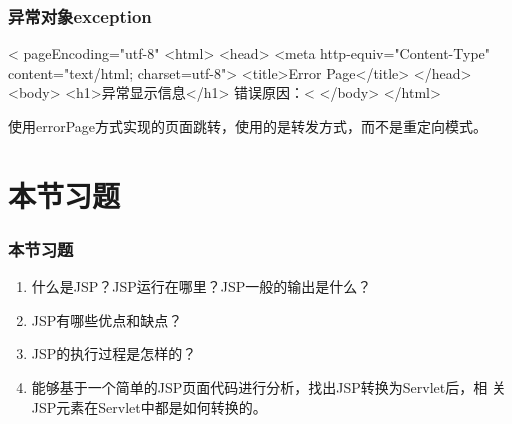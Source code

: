 \begin{frame}[fragile] %
\frametitle{异常对象exception} 


\begin{jspCode}
  <%
    pageEncoding="utf-8"%
  <html>
    <head>
      <meta http-equiv="Content-Type" content="text/html; charset=utf-8">
      <title>Error Page</title>
    </head>
    <body>
      <h1>异常显示信息</h1>
      错误原因：<%
    </body>
  </html>  
\end{jspCode}

{\kai\Red 使用errorPage方式实现的页面跳转，使用的是转发方式，而不是重定向模式。}
\end{frame}



\section{本节习题}

\begin{frame}
  \frametitle{本节习题}

  
  \begin{enumerate}
  \item 什么是JSP？JSP运行在哪里？JSP一般的输出是什么？
  \item JSP有哪些优点和缺点？
  \item JSP的执行过程是怎样的？
  \item 能够基于一个简单的JSP页面代码进行分析，找出JSP转换为Servlet后，相
    关JSP元素在Servlet中都是如何转换的。
  \end{enumerate}
\end{frame}
  
